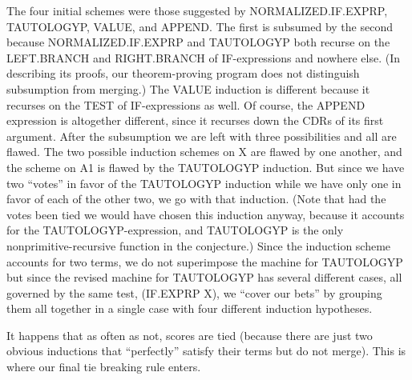 \documentclass[11pt]{book}
\begin{document}
The four initial schemes were those suggested by NOR\-MAL\-IZED.IF.EXPRP,
TAUTOLOGYP, VALUE, and APPEND.  The first is subsumed
by the second because NOR\-MAL\-IZED.IF.EXPRP and TAU\-TOL\-OGYP
both recurse on the LEFT.BRANCH and RIGHT.BRANCH of
IF-expressions and nowhere else.  (In describing its
proofs, our theorem-proving program does not distinguish
subsumption from merging.)
The VALUE induction is different
because it recurses on the TEST of IF-expressions as well.  Of course,
the APPEND expression is altogether different, since it recurses down
the CDRs of its first argument.  After the subsumption we are left with
three possibilities and all are flawed.  The two possible induction schemes
on X are flawed by one another, and the scheme on A1 is flawed by the
TAUTOLOGYP induction.  But since we have two ``votes'' in favor of the TAUTOLOGYP
induction while we have only one in favor of each of the other two,
we go with that induction.  (Note that had the votes been tied we
would have chosen this induction anyway, because it accounts for
the TAUTOLOGYP-expression, and TAUTOLOGYP is the only nonprimitive-recursive
function in the conjecture.)  Since the induction scheme accounts
for two terms, we do not superimpose the machine for TAUTOLOGYP
but since the revised machine for  TAUTOLOGYP has several
different cases, all governed by the same test, (IF.EXPRP X),
we ``cover our bets'' by grouping them all together in a 
single case with four different induction hypotheses.

It happens that as often as not, scores are tied (because there
are just two obvious inductions that ``perfectly''
satisfy their terms but do not merge).  This is where our
final tie breaking rule enters.
\end{document}
